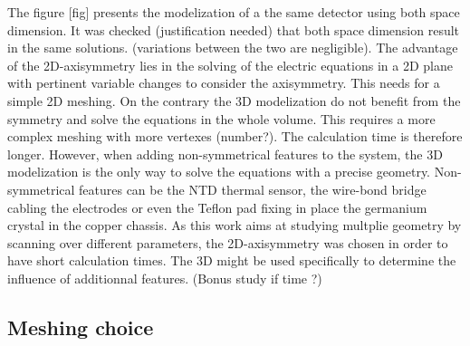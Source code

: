 The figure [fig] presents the modelization of a the same detector using both space dimension. It was checked (justification needed) that both space dimension result in the same solutions. (variations between the two are negligible). The advantage of the 2D-axisymmetry lies in the solving of the electric equations in a 2D plane with pertinent variable changes to consider the axisymmetry. This needs for a simple 2D meshing. On the contrary the 3D modelization do not benefit from the symmetry and solve the equations in the whole volume. This requires a more complex meshing with more vertexes (number?). The calculation time is therefore longer. However, when adding non-symmetrical features to the system, the 3D modelization is the only way to solve the equations with a precise geometry. Non-symmetrical features can be the NTD thermal sensor, the wire-bond bridge cabling the electrodes or even the Teflon pad fixing in place the germanium crystal in the copper chassis.
As this work aims at studying multplie geometry by scanning over different parameters, the 2D-axisymmetry was chosen in order to have short calculation times. The 3D might be used specifically to determine the influence of additionnal features. (Bonus study if time ?)


\subsection{Meshing choice}

